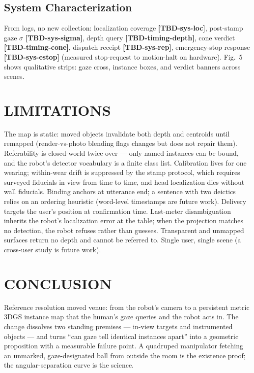 \documentclass[letterpaper, 10 pt, conference]{ieeeconf}  %
\newcommand{\TBD}[1]{\textbf{\color{red}[TBD-#1]}}
\begin{document}
\subsection{System Characterization}
From logs, no new collection: localization coverage \TBD{sys-loc},
post-stamp gaze $\sigma$ \TBD{sys-sigma}, depth query
\TBD{timing-depth}, cone verdict \TBD{timing-cone}, dispatch receipt
\TBD{sys-rep}, emergency-stop response \TBD{sys-estop} (measured
stop-request to motion-halt on hardware). Fig.~5 shows qualitative
strips: gaze cross, instance boxes, and verdict banners across
scenes.

\section{LIMITATIONS}
The map is static: moved objects invalidate both depth and centroids
until remapped (render-vs-photo blending flags changes but does not
repair them). Referability is closed-world twice over --- only named
instances can be bound, and the robot's detector vocabulary is a
finite class list. Calibration lives for one wearing; within-wear
drift is suppressed by the stamp protocol, which requires surveyed
fiducials in view from time to time, and head localization dies
without wall fiducials. Binding anchors at utterance end; a sentence
with two deictics relies on an ordering heuristic (word-level
timestamps are future work). Delivery targets the user's position at
confirmation time. Last-meter disambiguation inherits the robot's
localization error at the table; when the projection matches no
detection, the robot refuses rather than guesses. Transparent and unmapped surfaces
return no depth and cannot be referred to. Single user, single scene
(a cross-user study is future work).

\section{CONCLUSION}
Reference resolution moved venue: from the robot's camera to a
persistent metric 3DGS instance map that the human's gaze queries and
the robot acts in. The change dissolves two standing premises ---
in-view targets and instrumented objects --- and turns ``can gaze
tell identical instances apart'' into a geometric proposition with a
measurable failure point. A quadruped manipulator fetching an
unmarked, gaze-designated ball from outside the room is the
existence proof; the angular-separation curve is the science.
\end{document}
